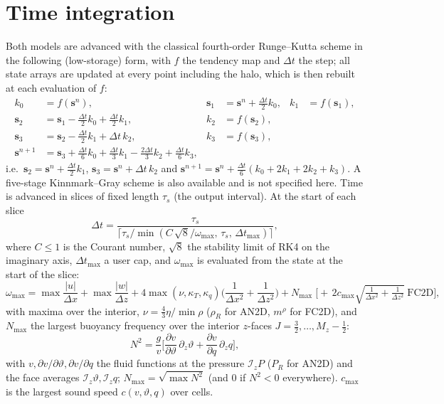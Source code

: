 \documentclass[11pt,a4paper]{article}
\newcommand{\vt}{\vartheta}                    %
\newcommand{\Iz}{\mathcal{I}_z}
\begin{document}
\section{Time integration}
Both models are advanced with the classical fourth-order Runge--Kutta scheme in the following (low-storage) form, with $f$ the tendency map and $\Delta t$ the step; all state arrays are updated at every point including the halo, which is then rebuilt at each evaluation of $f$:
\begin{align}
  k_0&=f(\mathbf s^n), & \mathbf s_1&=\mathbf s^n+\tfrac{\Delta t}2k_0, & k_1&=f(\mathbf s_1),\\
  \mathbf s_2&=\mathbf s_1-\tfrac{\Delta t}2k_0+\tfrac{\Delta t}2k_1, & k_2&=f(\mathbf s_2), & &\\
  \mathbf s_3&=\mathbf s_2-\tfrac{\Delta t}2k_1+\Delta t\,k_2, & k_3&=f(\mathbf s_3), & &\\
  \mathbf s^{n+1}&=\mathbf s_3+\tfrac{\Delta t}6k_0+\tfrac{\Delta t}3k_1-\tfrac{2\Delta t}3k_2+\tfrac{\Delta t}6k_3, & & & &
\end{align}
i.e.\ $\mathbf s_2=\mathbf s^n+\frac{\Delta t}2k_1$, $\mathbf s_3=\mathbf s^n+\Delta t\,k_2$ and $\mathbf s^{n+1}=\mathbf s^n+\frac{\Delta t}6(k_0+2k_1+2k_2+k_3)$. A five-stage Kinnmark--Gray scheme is also available and is not specified here.
Time is advanced in slices of fixed length $\tau_s$ (the output interval). At the start of each slice
\begin{equation}
  \Delta t=\frac{\tau_s}{\lceil\tau_s/\min(C\,\sqrt8/\omega_{\max},\,\tau_s,\,\Delta t_{\max})\rceil},
\end{equation}
where $C\le1$ is the Courant number, $\sqrt8$ the stability limit of RK4 on the imaginary axis, $\Delta t_{\max}$ a user cap, and $\omega_{\max}$ is evaluated from the state at the start of the slice:
\begin{equation}
  \omega_{\max}=\max\frac{|u|}{\Delta x}+\max\frac{|w|}{\Delta z}
  +4\max(\nu,\kappa_T,\kappa_q)\Big(\frac1{\Delta x^2}+\frac1{\Delta z^2}\Big)+N_{\max}
  \;\Big[+\,2c_{\max}\sqrt{\tfrac1{\Delta x^2}+\tfrac1{\Delta z^2}}\ \text{FC2D}\Big],
\end{equation}
with maxima over the interior, $\nu=\tfrac43\eta/\min\rho$ ($\rho_R$ for AN2D, $m^\rho$ for FC2D), and $N_{\max}$ the largest buoyancy frequency over the interior $z$-faces $J=\tfrac32,\dots,M_z-\tfrac12$:
\begin{equation}
  N^2=\frac{g}{v}\Big[\frac{\partial v}{\partial\vt}\,\partial_z\vt+\frac{\partial v}{\partial q}\,\partial_zq\Big],
\end{equation}
with $v,\partial v/\partial\vt,\partial v/\partial q$ the fluid functions at the pressure $\Iz P$ ($P_R$ for AN2D) and the face averages $\Iz\vt,\Iz q$; $N_{\max}=\sqrt{\max N^2}$ (and $0$ if $N^2<0$ everywhere). $c_{\max}$ is the largest sound speed $c(v,\vt,q)$ over cells.
\end{document}
